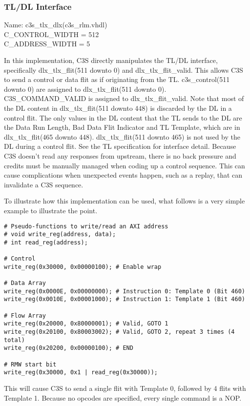 \subsubsection{TL/DL Interface}
Name: c3s\_tlx\_dlx(c3s\_rlm.vhdl) \\
C\_CONTROL\_WIDTH = 512 \\
C\_ADDRESS\_WIDTH = 5

In this implementation, C3S directly manipulates the TL/DL interface,
specifically dlx\_tlx\_flit(511 downto 0) and
dlx\_tlx\_flit\_valid. This allows C3S to send a control or data flit
as if originating from the TL. c3s\_control(511 downto 0) are assigned
to dlx\_tlx\_flit(511 downto 0). C3S\_COMMAND\_VALID is assigned to
dlx\_tlx\_flit\_valid. Note that most of the DL content in
dlx\_tlx\_flit(511 downto 448) is discarded by the DL in a control
flit. The only values in the DL content that the TL sends to the DL
are the Data Run Length, Bad Data Flit Indicator and TL Template,
which are in dlx\_tlx\_flit(465 downto 448). dlx\_tlx\_flit(511 downto
465) is not used by the DL during a control flit. See the TL
specification for interface detail. Because C3S doesn't read any
responses from upstream, there is no back pressure and credits must be
manually managed when coding up a control sequence. This can cause
complications when unexpected events happen, such as a replay, that
can invalidate a C3S sequence.

To illustrate how this implementation can be used, what follows is a
very simple example to illustrate the point.

\lstset{language=Perl}
\begin{lstlisting}
# Pseudo-functions to write/read an AXI address
# void write_reg(address, data);
# int read_reg(address);

# Control
write_reg(0x30000, 0x00000100); # Enable wrap

# Data Array
write_reg(0x0000E, 0x00000000); # Instruction 0: Template 0 (Bit 460)
write_reg(0x0010E, 0x00001000); # Instruction 1: Template 1 (Bit 460)

# Flow Array
write_reg(0x20000, 0x80000001); # Valid, GOTO 1
write_reg(0x20100, 0x80003002); # Valid, GOTO 2, repeat 3 times (4 total)
write_reg(0x20200, 0x00000100); # END

# RMW start bit
write_reg(0x30000, 0x1 | read_reg(0x30000));
\end{lstlisting}

This will cause C3S to send a single flit with Template 0, followed by
4 flits with Template 1. Because no opcodes are specified, every
single command is a NOP.

